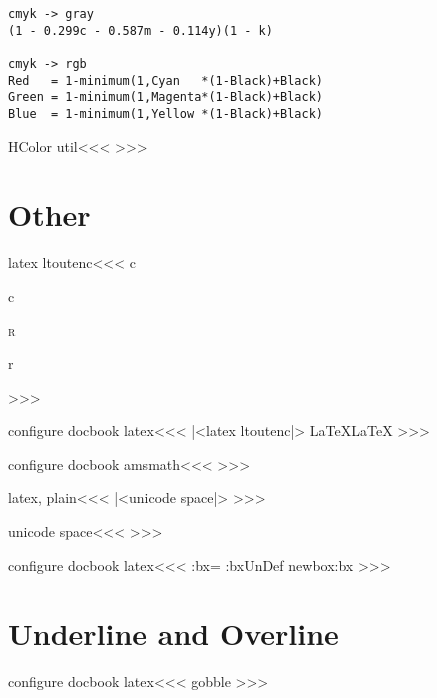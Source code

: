 \begin{verbatim}
cmyk -> gray
(1 - 0.299c - 0.587m - 0.114y)(1 - k) 

cmyk -> rgb
Red   = 1-minimum(1,Cyan   *(1-Black)+Black)
Green = 1-minimum(1,Magenta*(1-Black)+Black)
Blue  = 1-minimum(1,Yellow *(1-Black)+Black)
\end{verbatim}



\<HColor util\><<<
\def\:cmyk#1#2{%
   \tmp:cnt=255 \advance\tmp:cnt by -\:Black
   \multiply\tmp:cnt by#2 \advance\tmp:cnt by \:Black 
   \advance\tmp:cnt by -255 \tmp:cnt=-\tmp:cnt
   \ifnum \tmp:cnt<0 \tmp:cnt=0 \fi
   \edef#1{\the\tmp:cnt}%
}
>>>






\section{Other}


\<latex ltoutenc\><<<
   {\@use@text@encoding \@curr@enc c}       
   {\leavevmode {}c}
   {\@use@text@encoding \@curr@enc \scshape r}
   {\leavevmode {}r}
   {}
>>>


\<configure docbook latex\><<<
|<latex ltoutenc|>
\def\:temp{LaTeX}
\HLet\LaTeX\:temp
>>>

\<configure docbook amsmath\><<<
\def\:temp{{\protect\AmSfont AMS}}
\HLet\AmS\:temp
>>>


\<latex, plain\><<<
|<unicode space|>
>>>

\<unicode space\><<<
\def\:nbsp{\HCode{\string&}\HChar{-35}\HCode{x00A0;}}%
>>>


\<configure docbook latex\><<<
    {\bgroup\let\@makefnmark\empty}
    {\egroup}%
    {}
   {\setbox\tmp:bx=\hbox\bgroup}
   {\egroup}
\ifx \tmp:bx\:UnDef \csname newbox\endcsname \tmp:bx \fi 
>>>





\section{Underline and Overline}



\<configure docbook latex\><<<
   {\:gobble}
   {}
   {}
   {}
>>>

